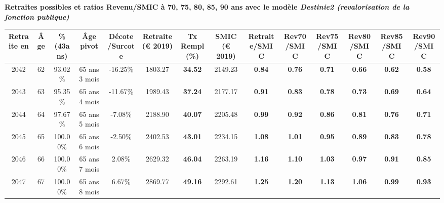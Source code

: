  \vspace{0.1cm} 
{\bf \noindent Retraites possibles et ratios Revenu/SMIC à 70, 75, 80, 85, 90 ans avec le modèle \emph{Destinie2 (revalorisation de la fonction publique)}}  
 
\begin{adjustbox}{max width=\textwidth} 
\begin{tabular}[htb]{|c|c||c|c|c||c|c||c||c|c|c|c|c|c|} 
\hline 
 Retraite en &  Âge &  \%(43ans) &  Âge pivot &  Décote/Surcote &  Retraite (\euro{} 2019) &  Tx Rempl(\%) &  SMIC (\euro{} 2019) &  Retraite/SMIC &  Rev70/SMIC &  Rev75/SMIC &  Rev80/SMIC &  Rev85/SMIC &  Rev90/SMIC \\ 
\hline \hline 
 2042 &  62 &  93.02\% &  65 ans 3 mois &  -16.25\% &  1803.27 &  {\bf 34.52} &  2149.23 &  {\bf {\color{red} 0.84}} &  {\bf {\color{red} 0.76}} &  {\bf {\color{red} 0.71}} &  {\bf {\color{red} 0.66}} &  {\bf {\color{red} 0.62}} &  {\bf {\color{red} 0.58}} \\ 
\hline 
 2043 &  63 &  95.35\% &  65 ans 4 mois &  -11.67\% &  1989.43 &  {\bf 37.24} &  2177.17 &  {\bf {\color{red} 0.91}} &  {\bf {\color{red} 0.83}} &  {\bf {\color{red} 0.78}} &  {\bf {\color{red} 0.73}} &  {\bf {\color{red} 0.69}} &  {\bf {\color{red} 0.64}} \\ 
\hline 
 2044 &  64 &  97.67\% &  65 ans 5 mois &  -7.08\% &  2188.90 &  {\bf 40.07} &  2205.48 &  {\bf {\color{red} 0.99}} &  {\bf {\color{red} 0.92}} &  {\bf {\color{red} 0.86}} &  {\bf {\color{red} 0.81}} &  {\bf {\color{red} 0.76}} &  {\bf {\color{red} 0.71}} \\ 
\hline 
 2045 &  65 &  100.00\% &  65 ans 6 mois &  -2.50\% &  2402.53 &  {\bf 43.01} &  2234.15 &  {\bf 1.08} &  {\bf 1.01} &  {\bf {\color{red} 0.95}} &  {\bf {\color{red} 0.89}} &  {\bf {\color{red} 0.83}} &  {\bf {\color{red} 0.78}} \\ 
\hline 
 2046 &  66 &  100.00\% &  65 ans 7 mois &  2.08\% &  2629.32 &  {\bf 46.04} &  2263.19 &  {\bf 1.16} &  {\bf 1.10} &  {\bf 1.03} &  {\bf {\color{red} 0.97}} &  {\bf {\color{red} 0.91}} &  {\bf {\color{red} 0.85}} \\ 
\hline 
 2047 &  67 &  100.00\% &  65 ans 8 mois &  6.67\% &  2869.77 &  {\bf 49.16} &  2292.61 &  {\bf 1.25} &  {\bf 1.20} &  {\bf 1.13} &  {\bf 1.06} &  {\bf {\color{red} 0.99}} &  {\bf {\color{red} 0.93}} \\ 
\hline 
\hline 
\end{tabular} 
\end{adjustbox} 
 
